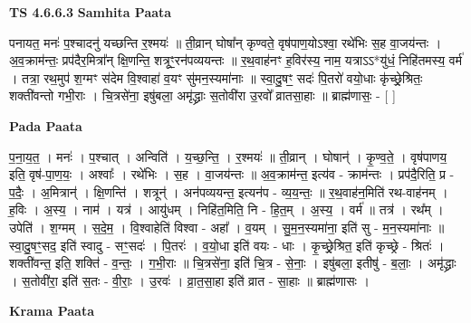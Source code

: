 \documentclass[17pt]{extarticle}
\begin{document}
\textbf{TS 4.6.6.3 } \newline
\textbf{Samhita Paata} \newline

पनायत॒ मनः॑ प॒श्चादनु॑ यच्छन्ति र॒श्मयः॑ ॥ ती॒व्रान् घोषा᳚न् कृण्वते॒ वृष॑पाण॒योऽश्वा॒ रथे॑भिः स॒ह वा॒जय॑न्तः । अ॒व॒क्राम॑न्तः॒ प्रप॑दैर॒मित्रा᳚न् क्षि॒णन्ति॒ शत्रूꣳ॒॒रन॑पव्ययन्तः ॥ र॒थ॒वाह॑नꣳ ह॒विर॑स्य॒ नाम॒ यत्राऽऽ*यु॑धं॒ निहि॑तमस्य॒ वर्म॑ । तत्रा॒ रथ॒मुप॑ श॒ग्मꣳ स॑देम वि॒श्वाहा॑ व॒यꣳ सु॑मन॒स्यमा॑नाः ॥ स्वा॒दु॒षꣳ॒॒ सदः॑ पि॒तरो॑ वयो॒धाः कृ॑च्छ्रे॒श्रितः॒ शक्ती॑वन्तो गभी॒राः । चि॒त्रसे॑ना॒ इषु॑बला॒ अमृ॑द्ध्राः स॒तोवी॑रा उ॒रवो᳚ व्रातसा॒हाः ॥ ब्राह्म॑णासः॒ - [  ] \newline

\textbf{Pada Paata} \newline

प॒ना॒य॒त॒ । मनः॑ । प॒श्चात् । अन्विति॑ । य॒च्छ॒न्ति॒ । र॒श्मयः॑ ॥ ती॒व्रान् । घोषान्॑ । कृ॒ण्व॒ते॒ । वृष॑पाणय॒ इति॒ वृष॑-पा॒ण॒यः॒ । अश्वाः᳚ । रथे॑भिः । स॒ह । वा॒जय॑न्तः ॥ अ॒व॒क्राम॑न्त॒ इत्य॑व - क्राम॑न्तः । प्रप॑दै॒रिति॒ प्र - प॒दैः॒ । अ॒मित्रान्॑ । क्षि॒णन्ति॑ । शत्रून्॑ । अन॑पव्ययन्त॒ इत्यन॑प - व्य॒य॒न्तः॒ ॥ र॒थ॒वाह॑न॒मिति॑ रथ-वाह॑नम् । ह॒विः । अ॒स्य॒ । नाम॑ । यत्र॑ । आयु॑धम् । निहि॑त॒मिति॒ नि - हि॒त॒म् । अ॒स्य॒ । वर्म॑ ॥ तत्र॑ । रथ᳚म् । उपेति॑ । श॒ग्मम् । स॒दे॒म॒ । वि॒श्वाहेति॑ विश्वा - अहा᳚ । व॒यम् । सु॒म॒न॒स्यमा॑ना॒ इति॑ सु - म॒न॒स्यमा॑नाः ॥ स्वा॒दु॒षꣳ॒॒सद॒ इति॑ स्वादु - सꣳ॒॒सदः॑ । पि॒तरः॑ । व॒यो॒धा इति॑ वयः - धाः । कृ॒च्छ्रे॒श्रित॒ इति॑ कृच्छ्रे - श्रितः॑ । शक्ती॑वन्त॒ इति॒ शक्ति॑ - व॒न्तः॒ । ग॒भी॒राः ॥ चि॒त्रसे॑ना॒ इति॑ चि॒त्र - से॒नाः॒ । इषु॑बला॒ इतीषु॑ - ब॒लाः॒ । अमृ॑द्ध्राः । स॒तोवी॑रा॒ इति॑ स॒तः - वी॒राः॒ । उ॒रवः॑ । व्रा॒त॒सा॒हा इति॑ व्रात - सा॒हाः ॥ ब्राह्म॑णासः ।  \newline


\textbf{Krama Paata} \newline
\end{document}
